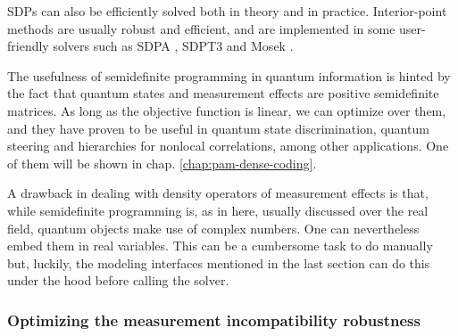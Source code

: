 			SDPs can also be efficiently solved both in theory and in practice. Interior-point methods are usually robust and efficient, and are implemented in some user-friendly solvers such as SDPA \cite{}, SDPT3 \cite{} and Mosek \cite{}.

			The usefulness of semidefinite programming in quantum information is hinted by the fact that quantum states and measurement effects are positive semidefinite matrices. As long as the objective function is linear, we can optimize over them, and they have proven to be useful in quantum state discrimination, quantum steering and hierarchies for nonlocal correlations, among other applications. One of them will be shown in chap. \ref{chap:pam-dense-coding}.

			A drawback in dealing with density operators of measurement effects is that, while semidefinite programming is, as in here, usually discussed over the real field, quantum objects make use of complex numbers. One can nevertheless embed them in real variables. This can be a cumbersome task to do manually but, luckily, the modeling interfaces mentioned in the last section can do this under the hood before calling the solver.


			\subsubsection{Optimizing the measurement incompatibility robustness}
			\label{sec:incompatibility-robustness}
				\todo{}